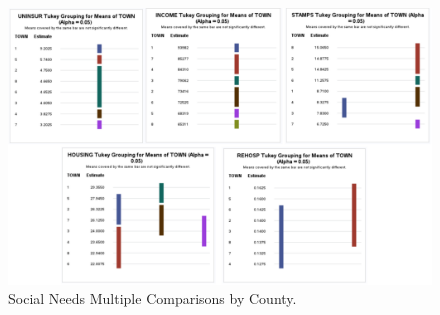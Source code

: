 \documentclass[12pt]{article}
\begin{document}
\begin{figure}[tbp]
  \label{fig:Social Needs by County Graph}
    \centering
    \includegraphics[width=\textwidth]{Multiple Comparisons by County.pdf}
    \caption{Social Needs Multiple Comparisons by County.}
  \end{figure}
\end{document}
